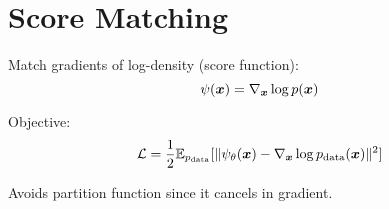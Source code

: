 
\section{Score Matching}
\label{sec:score-matching}

Match gradients of log-density (score function):
\begin{equation}
\psi(\boldsymbol{x}) = \nabla_{\boldsymbol{x}} \log p(\boldsymbol{x})
\end{equation}

Objective:
\begin{equation}
\mathcal{L} = \frac{1}{2} \mathbb{E}_{p_{\text{data}}}[\|\psi_{\theta}(\boldsymbol{x}) - \nabla_{\boldsymbol{x}} \log p_{\text{data}}(\boldsymbol{x})\|^2]
\end{equation}

Avoids partition function since it cancels in gradient.
